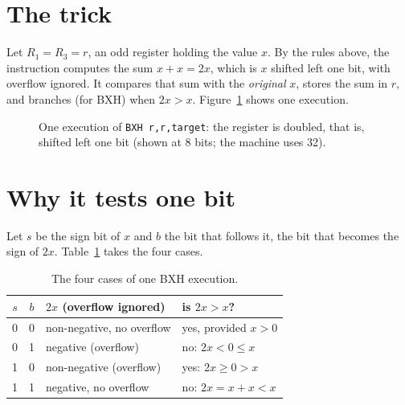 \documentclass[11pt]{article}
\newcommand{\cell}[4]{%
  \node[draw, minimum width=7mm, minimum height=7mm, fill=#4,
        font=\ttfamily\small] at (#1,#2) {#3};}
\begin{document}
\section{The trick}

Let $R_1 = R_3 = r$, an odd register holding the value $x$. By the rules
above, the instruction computes the sum $x + x = 2x$, which is $x$ shifted
left one bit, with overflow ignored. It compares that sum with the
\emph{original} $x$, stores the sum in $r$, and branches (for BXH) when
$2x > x$. Figure~\ref{fig:one} shows one execution.

\begin{figure}[ht]
\centering
{}
\caption{One execution of \texttt{BXH r,r,target}: the register is doubled,
that is, shifted left one bit (shown at 8 bits; the machine uses 32).}
\label{fig:one}
\end{figure}

\section{Why it tests one bit}

Let $s$ be the sign bit of $x$ and $b$ the bit that follows it, the bit that
becomes the sign of $2x$. Table~\ref{tab:cases} takes the four cases.

\begin{table}[ht]
\centering
\begin{tabular}{ccll}
\toprule
$s$ & $b$ & $2x$ (overflow ignored) & is $2x > x$? \\
\midrule
0 & 0 & non-negative, no overflow & yes, provided $x > 0$ \\
0 & 1 & negative (overflow) & no: $2x < 0 \le x$ \\
1 & 0 & non-negative (overflow) & yes: $2x \ge 0 > x$ \\
1 & 1 & negative, no overflow & no: $2x = x + x < x$ \\
\bottomrule
\end{tabular}
\caption{The four cases of one BXH execution.}
\label{tab:cases}
\end{table}
\end{document}
